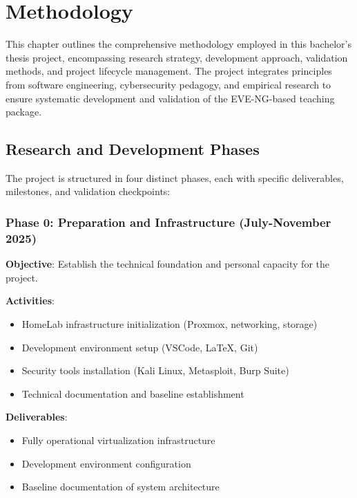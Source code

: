 
\chapter{Methodology}


This chapter outlines the comprehensive methodology employed in this bachelor's thesis project, encompassing research strategy, development approach, validation methods, and project lifecycle management. The project integrates principles from software engineering, cybersecurity pedagogy, and empirical research to ensure systematic development and validation of the EVE-NG-based teaching package.

\section{Research and Development Phases}

The project is structured in four distinct phases, each with specific deliverables, milestones, and validation checkpoints:

\subsection{Phase 0: Preparation and Infrastructure (July-November 2025)}

\textbf{Objective}: Establish the technical foundation and personal capacity for the project.

\textbf{Activities}:
\begin{itemize}
\item HomeLab infrastructure initialization (Proxmox, networking, storage)
\item Development environment setup (VSCode, LaTeX, Git)
\item Security tools installation (Kali Linux, Metasploit, Burp Suite)
\item Technical documentation and baseline establishment
\end{itemize}

\textbf{Deliverables}:
\begin{itemize}
\item Fully operational virtualization infrastructure
\item Development environment configuration
\item Baseline documentation of system architecture
\end{itemize}

